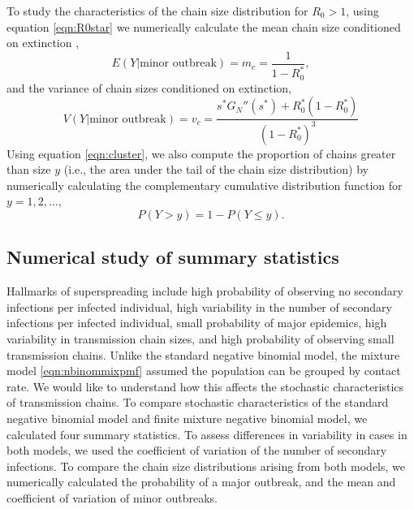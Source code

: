 \documentclass{imammb}
\numberwithin{equation}{section}
\begin{document}
To study the characteristics of the chain size distribution for $R_0>1$, using equation \eqref{eqn:R0star} we numerically calculate the mean chain size conditioned on extinction \citep{Yan2008-jc}, 
\begin{equation}\label{eqn:meanchain}
   E(Y|\text{minor outbreak}) = m_c= \frac{1}{1-R_0^*},
\end{equation}
and the variance of chain sizes conditioned on extinction,
\begin{equation}\label{eqn:varchain}
    V(Y|\text{minor outbreak}) =v_c = \frac{s^* G_N''(s^*)+R_0^{*}(1-R_0^*)}{(1-R_0^*)^3}
\end{equation}
Using equation \eqref{eqn:cluster}, we also compute the proportion of chains greater than size $y$ (i.e., the area under the tail of the chain size distribution) by numerically calculating the complementary cumulative distribution function for $y = 1, 2,\dots,$
\begin{equation}
    P(Y>y) = 1-P(Y\leq y). 
\end{equation}


\subsection{Numerical study of summary statistics}

Hallmarks of superspreading include  high probability of observing no secondary infections per infected individual, high variability in the number of secondary infections per infected individual, small probability of major epidemics, high variability in transmission chain sizes, and high probability of observing small transmission chains. Unlike the standard negative binomial model, the mixture model \eqref{eqn:nbinommixpmf} assumed the population can be grouped by contact rate. We would like to understand how this affects the stochastic characteristics of transmission chains. To compare stochastic characteristics of the standard negative binomial model and finite mixture negative binomial model, we calculated four summary statistics. To assess differences in variability in cases in both models, we used the coefficient of variation of the number of secondary infections. To compare the chain size distributions arising from both models, we numerically calculated the probability of a major outbreak, and the mean and coefficient of variation of minor outbreaks. 
\end{document}
